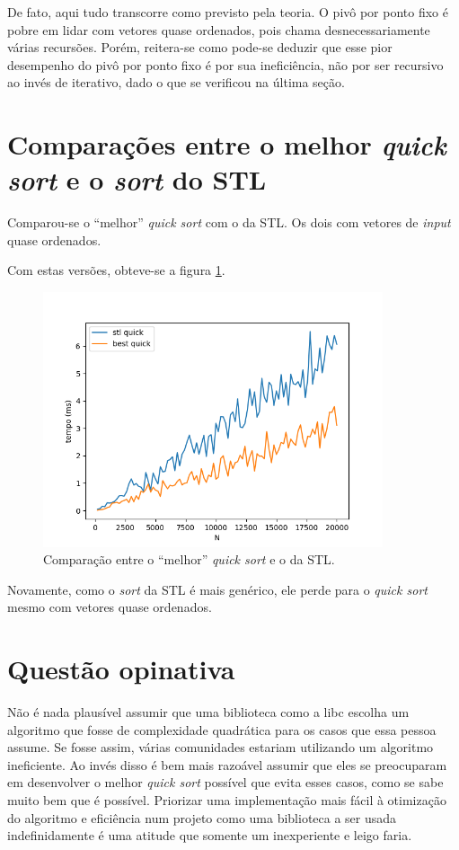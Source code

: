 \documentclass{article}[twocolumn]
\begin{document}
	De fato, aqui tudo transcorre como previsto pela teoria. O piv\^o por ponto fixo \'e pobre
	em lidar com vetores quase ordenados, pois chama desnecessariamente v\'arias recurs\~oes.
	Por\'em, reitera-se como pode-se deduzir que esse pior desempenho do piv\^o por ponto fixo
	\'e por sua inefici\^encia, n\~ao por ser recursivo ao inv\'es de iterativo, dado o que
	se verificou na \'ultima se\c{c}\~ao.

	\section{Compara\c{c}\~oes entre o melhor \textit{quick sort} e o \textit{sort} do STL}
	Comparou-se o ``melhor'' \textit{quick sort} com o da STL.
	Os dois com vetores de \textit{input} quase ordenados.

	Com estas vers\~oes, obteve-se a figura \ref{fig:best}.
	\begin{figure}[H]
		\centering
		\includegraphics[width=10cm]{beststl_time.png}
		\caption{Compara\c{c}\~ao entre o ``melhor'' \textit{quick sort} e o da STL.}
		\label{fig:best}
	\end{figure}
	Novamente, como o \textit{sort} da STL \'e mais gen\'erico, ele perde para o \textit{quick
	sort} mesmo com vetores quase ordenados.
	\section{Quest\~ao opinativa}
	N\~ao \'e nada plaus\'ivel assumir que uma biblioteca como a libc escolha um algoritmo
	que fosse de complexidade quadr\'atica para os casos que essa pessoa assume. Se fosse assim,
	v\'arias comunidades estariam utilizando um algoritmo ineficiente. Ao inv\'es disso \'e
	bem mais razo\'avel assumir que eles se preocuparam em desenvolver o melhor \textit{quick
	sort} poss\'ivel que evita esses casos, como se sabe muito bem que \'e poss\'ivel. Priorizar
	uma implementa\c{c}\~ao mais f\'acil \`a otimiza\c{c}\~ao do algoritmo e efici\^encia
	num projeto como uma biblioteca a ser usada indefinidamente \'e uma atitude que somente
	um inexperiente e leigo faria.
\end{document}
